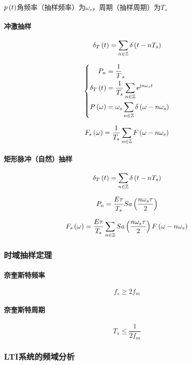 \documentclass{article}
\begin{document}
$p\left(t\right)$角频率（抽样频率）为$\omega_s$，周期（抽样周期）为$T_s$

\paragraph{冲激抽样}

\[\delta_T\left(t\right)=\sum_{n\in\mathbb Z}\delta\left(t-nT_s\right)\]

\[\left\{\begin{aligned}
        P_n              & =\frac1T_s                                   \\
        \delta_T\left(t\right) & =\frac1{T_s}\sum_{n\in\mathbb Z}\mathrm e^{\mathrm j n\omega_s t}        \\
        P\left(\omega\right)   & =\omega_s\sum_{n\in\mathbb Z}\delta\left(\omega-n\omega_s\right)
    \end{aligned}\right.\]

\[F_s\left(\omega\right)=\frac1{T_s}\sum_{n\in\mathbb Z} F\left(\omega-n\omega_s\right)\]

\paragraph{矩形脉冲（自然）抽样}

\[\delta_T\left(t\right)=\sum_{n\in\mathbb Z}\delta\left(t-nT_s\right)\]

\[P_n=\frac{E\tau}{T_s}Sa\left(\frac{n\omega_s\tau}2\right)\]

\[F_s\left(\omega\right)=\frac{E\tau}{T_s}\sum_{n\in\mathbb Z} Sa\left(\frac{n\omega_s\tau}2\right)F\left(\omega-n\omega_s\right)\]

\subsubsection{时域抽样定理}

\paragraph{奈奎斯特频率}

\[f_s\geqslant2f_m\]

\paragraph{奈奎斯特周期}

\[T_s\leqslant\frac1{2f_m}\]

\subsubsection{LTI系统的频域分析}
\end{document}
